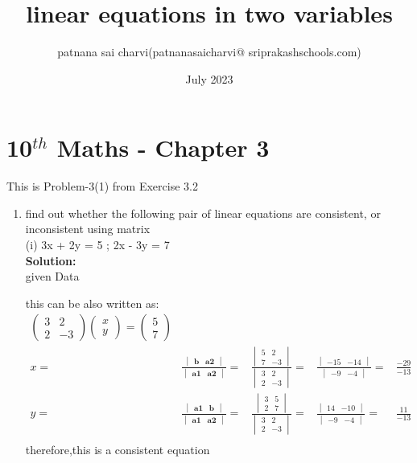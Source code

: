 \documentclass{article}
\date{July 2023}
\title{linear equations in two variables}
\author{patnana sai charvi(patnanasaicharvi@ sriprakashschools.com)}
\newcommand{\myvec}[1]{\ensuremath{\begin{pmatrix}#1\end{pmatrix}}}
\newcommand{\mydet}[1]{\ensuremath{\begin{vmatrix}#1\end{vmatrix}}}
\newcommand{\solution}{\noindent \textbf{Solution: }}
\let\vec\mathbf
\begin{document}
\maketitle
\section*{10$^{th}$ Maths - Chapter 3}
This is Problem-3(1) from Exercise 3.2
\begin{enumerate}
\item  find out whether the following pair of linear equations are consistent, or inconsistent using matrix\\
    (i) 3x + 2y = 5 ; 2x - 3y = 7\\
\solution\\
given Data


this can be also written as:
\begin{align}
\myvec{3&2\\2&-3}\myvec{x\\y} = \myvec{5\\7}\\
x =&
\frac{\mydet{ \vec{b} & \vec{a2}}}{\mydet{\vec{a1} & \vec{a2}}}=&
\frac{\mydet{5 & 2\\7 & -3 }}{\mydet{3 & 2\\2 & -3}}=&
\frac{\mydet{-15&-14}}{\mydet{-9&-4}}=&
\frac{-29}{-13}\\
 y=&
\frac{\mydet{\vec{a1} & \vec{b} }}{\mydet{\vec{a1} &\vec{a2} }}=&
\frac{\mydet{3&5\\2&7}}{\mydet{3&2\\2&-3}}=&
\frac{\mydet{14&-10}}{\mydet{-9&-4}}=&
\frac{11}{-13}\\
\end{align}
therefore,this is a consistent equation


\end{enumerate}
\end{document}
